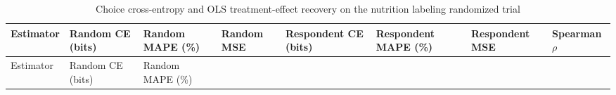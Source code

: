 \documentclass[
  letterpaper,
  DIV=11,
  numbers=noendperiod]{scrartcl}
\begin{document}
\begin{longtable}[]{@{}
  >{\raggedright\arraybackslash}p{}
  >{\raggedleft\arraybackslash}p{}
  >{\raggedleft\arraybackslash}p{}
  >{\raggedleft\arraybackslash}p{}
  >{\raggedleft\arraybackslash}p{}
  >{\raggedleft\arraybackslash}p{}
  >{\raggedleft\arraybackslash}p{}
  >{\raggedleft\arraybackslash}p{}@{}}
\caption{Choice cross-entropy and OLS treatment-effect recovery on the
nutrition labeling randomized
trial}\label{tbl-grummon2025-ols}\tabularnewline
\toprule\noalign{}
\begin{minipage}[b]{\linewidth}\raggedright
Estimator
\end{minipage} & \begin{minipage}[b]{\linewidth}\raggedleft
Random CE (bits)
\end{minipage} & \begin{minipage}[b]{\linewidth}\raggedleft
Random MAPE (\%)
\end{minipage} & \begin{minipage}[b]{\linewidth}\raggedleft
Random MSE
\end{minipage} & \begin{minipage}[b]{\linewidth}\raggedleft
Respondent CE (bits)
\end{minipage} & \begin{minipage}[b]{\linewidth}\raggedleft
Respondent MAPE (\%)
\end{minipage} & \begin{minipage}[b]{\linewidth}\raggedleft
Respondent MSE
\end{minipage} & \begin{minipage}[b]{\linewidth}\raggedleft
Spearman \(\rho\)
\end{minipage} \\
\midrule\noalign{}
\endfirsthead
\toprule\noalign{}
\begin{minipage}[b]{\linewidth}\raggedright
Estimator
\end{minipage} & \begin{minipage}[b]{\linewidth}\raggedleft
Random CE (bits)
\end{minipage} & \begin{minipage}[b]{\linewidth}\raggedleft
Random MAPE (\%)

\end{minipage}
\end{longtable}
\end{document}
